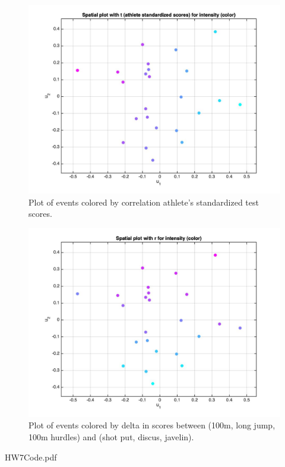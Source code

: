 \documentclass[12pt]{exam}
\begin{document}
\begin{questions}
   \begin{figure}[hpb!]
    \centering
    \includegraphics[scale=0.3]{data/spatial_t.jpg}
    \caption{Plot of events colored by correlation athlete's standardized test scores.}
    \label{fig:intensity_plot_t}
  \end{figure}

   \begin{figure}[hpb!]
    \centering
    \includegraphics[scale=0.3]{data/spatial_delta.jpg}
    \caption{Plot of events colored by delta in scores between (100m, long jump, 100m hurdles) and (shot put, discus, javelin).}
    \label{fig:intensity_plot_delta}
  \end{figure}
\end{questions}



{HW7Code.pdf}
\end{document}
